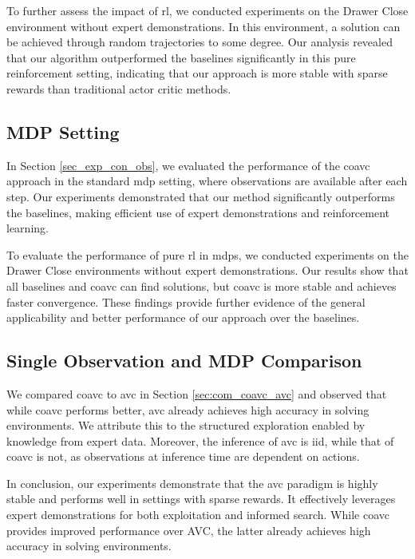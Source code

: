 To further assess the impact of \ac{rl}, we conducted experiments on the Drawer Close environment without expert demonstrations. 
In this environment, a solution can be achieved through random trajectories to some degree. 
Our analysis revealed that our algorithm outperformed the baselines significantly in this pure reinforcement setting, 
indicating that our approach is more stable with sparse rewards than traditional actor critic methods.




\subsection{MDP Setting}
In Section \ref{sec_exp_con_obs}, we evaluated the performance of the \ac{coavc} approach in the standard \ac{mdp} setting, 
where observations are available after each step. Our experiments demonstrated that our method significantly outperforms the baselines, making efficient use of expert demonstrations and reinforcement learning.

To evaluate the performance of pure \ac{rl} in \ac{mdp}s, we conducted experiments on the Drawer Close 
environments without expert demonstrations. Our results show that all baselines and \ac{coavc} can find solutions, but \ac{coavc} is more stable and achieves 
faster convergence. These findings provide further evidence of the general applicability and better performance of our approach over the baselines. 

\subsection{Single Observation and MDP Comparison}
We compared \ac{coavc} to \ac{avc} in Section \ref{sec:com_coavc_avc} and observed that while \ac{coavc} performs better, 
\ac{avc} already achieves high accuracy in solving environments. We attribute this to the structured exploration enabled by knowledge from 
expert data. Moreover, the inference of \ac{avc} is \ac{iid}, while that of \ac{coavc} is not, as observations at inference time are dependent on actions. 

In conclusion, our experiments demonstrate that the \ac{avc} paradigm is highly stable and performs well in settings with sparse rewards. 
It effectively leverages expert demonstrations for both exploitation and informed search. While \ac{coavc} provides improved performance over 
AVC, the latter already achieves high accuracy in solving environments.

